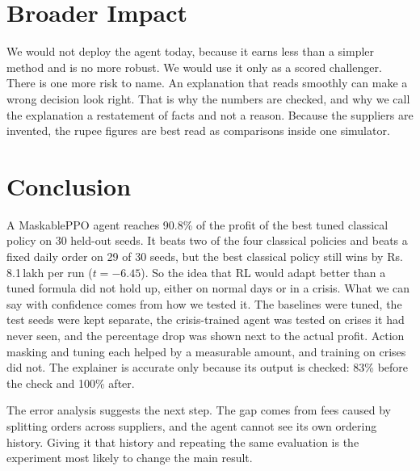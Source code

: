 \documentclass[10pt,twocolumn]{article}
\newcommand{\Rs}{\mbox{Rs.}\,}
\newcommand{\lakh}{\,lakh}
\begin{document}
\section{Broader Impact}

We would not deploy the agent today, because it earns less than a simpler
method and is no more robust. We would use it only as a scored challenger.
There is one more risk to name. An explanation that reads smoothly can make a
wrong decision look right. That is why the numbers are checked, and why we call
the explanation a restatement of facts and not a reason. Because the suppliers
are invented, the rupee figures are best read as comparisons inside one
simulator.

\section{Conclusion}

A MaskablePPO agent reaches 90.8\% of the profit of the best tuned classical
policy on 30 held-out seeds. It beats two of the four classical policies and
beats a fixed daily order on 29 of 30 seeds, but the best classical policy still
wins by \Rs 8.1\lakh{} per run ($t=-6.45$). So the idea that RL would adapt
better than a tuned formula did not hold up, either on normal days or in a
crisis. What we can say with confidence comes from how we tested it. The
baselines were tuned, the test seeds were kept separate, the crisis-trained
agent was tested on crises it had never seen, and the percentage drop was shown
next to the actual profit. Action masking and tuning each helped by a
measurable amount, and training on crises did not. The explainer is accurate
only because its output is checked: 83\% before the check and 100\% after.

The error analysis suggests the next step. The gap comes from fees caused by
splitting orders across suppliers, and the agent cannot see its own ordering
history. Giving it that history and repeating the same evaluation is the
experiment most likely to change the main result.
\end{document}
